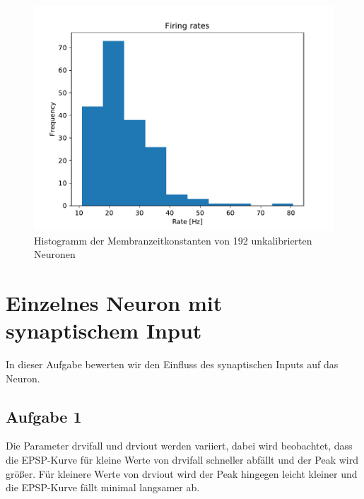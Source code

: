 \documentclass[10pt,a4paper]{scrartcl}
\begin{document}
\begin{figure} [ht]
\begin{center}
\label{fig:abb4}
\caption{Histogramm der Membranzeitkonstanten von 192 unkalibrierten Neuronen}
\includegraphics[scale=0.35]{pictures/firing_rates.pdf} 
\end{center}
\end{figure}


\newpage


\section{Einzelnes Neuron mit synaptischem Input}
In dieser Aufgabe bewerten wir den Einfluss des synaptischen Inputs auf das Neuron.


\subsection{Aufgabe 1}
Die Parameter drvifall und drviout werden variiert, dabei wird beobachtet, dass die EPSP-Kurve für kleine Werte von drvifall schneller abfällt und der Peak wird größer. Für kleinere Werte von drviout wird der Peak hingegen leicht kleiner und die EPSP-Kurve fällt minimal langsamer ab.
\end{document}
